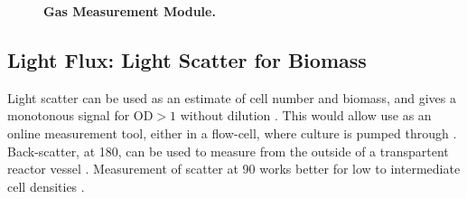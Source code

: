 \documentclass[12pt,a4paper]{scrartcl}
\begin{document}
\begin{figure}[ht]
  \begin{minipage}{.49\textwidth}
  \end{minipage}
  \begin{minipage}{.49\textwidth}
  \end{minipage}
\caption[]{\textbf{Gas Measurement Module.}}
\end{figure}

\clearpage
\subsection{Light Flux: Light Scatter for Biomass} 
\label{scatter}

Light scatter can be used as an estimate of cell number and biomass,
and gives a monotonous signal for OD$>1$ without dilution
\cite{Hancher1974}. This would allow use as an online measurement
tool, either in a flow-cell, where culture is pumped through \cite{Hancher1974}. Back-scatter, at 180\textdegree{}, can be used to measure from
the outside of a transpartent reactor vessel \cite{Ude2014,
  Bruder2016}. Measurement of scatter at 90\textdegree{} works better
for low to intermediate cell densities \cite{Ude2014}.
\end{document}
